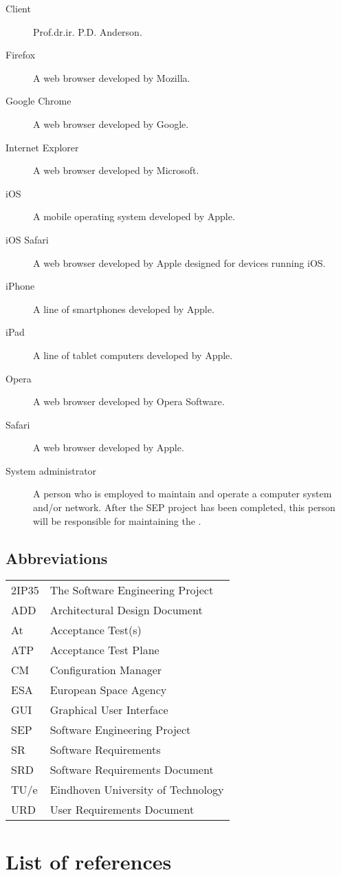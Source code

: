 \begin{description}
\item[Client] Prof.dr.ir. P.D. Anderson.
\item[Firefox] A web browser developed by Mozilla.
\item[Google Chrome] A web browser developed by Google.
\item[Internet Explorer] A web browser developed by Microsoft.
\item[iOS] A mobile operating system developed by Apple.
\item[iOS Safari] A web browser developed by Apple designed for devices running iOS.
\item[iPhone] A line of smartphones developed by Apple.
\item[iPad] A line of tablet computers developed by Apple.
\item[Opera] A web browser developed by Opera Software.
\item[Safari] A web browser developed by Apple.
\item[System administrator] A person who is employed to maintain and operate a computer system and/or network. After the SEP project has been completed, this person will be responsible for maintaining the \applicationname{}.
\end{description}


\subsection{Abbreviations}
\label{subsec:abbrev}
\begin{tabular}{l|l}
2IP35 & The Software Engineering Project \\
ADD & Architectural Design Document \\
At & Acceptance Test(s) \\
ATP & Acceptance Test Plane \\
CM    & Configuration Manager \\
ESA & European Space Agency \\
GUI & Graphical User Interface \\
SEP   & Software Engineering Project \\
SR    & Software Requirements \\
SRD   & Software Requirements Document \\
TU/e  & Eindhoven University of Technology \\
URD   & User Requirements Document \\
\end{tabular}


\section{List of references}
